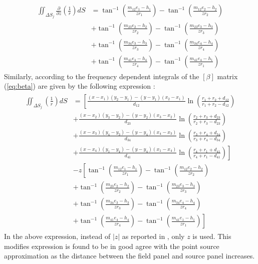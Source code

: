 \begin{align}
    \begin{split}
        \label{eq:partial_r_z}
        \iint_{\Delta S_j} \frac{\partial}{\partial z}\left(\frac{1}{r}\right) dS 
        &=\tan ^{-1}\left(\frac{m_{12} e_{1}-h_{1}}{z r_{1}}\right)-\tan ^{-1}\left(\frac{m_{12} e_{2}-h_{2}}{z r_{2}}\right) \\
        &+\tan ^{-1}\left(\frac{m_{23} e_{2}-h_{2}}{z r_{2}}\right)-\tan ^{-1}\left(\frac{m_{23} e_{3}-h_{3}}{z r_{3}}\right) \\
        &+\tan ^{-1}\left(\frac{m_{34} e_{3}-h_{3}}{z r_{3}}\right)-\tan ^{-1}\left(\frac{m_{34} e_{4}-h_{4}}{z r_{4}}\right) \\
        &+\tan ^{-1}\left(\frac{m_{41} e_{4}-h_{4}}{z r_{4}}\right)-\tan ^{-1}\left(\frac{m_{41} e_{4}-h_{1}}{z r_{1}}\right)
    \end{split}
\end{align}
\newpage
Similarly, according to \cite{katz2001low} the frequency dependent integrals of the $[\beta]$ matrix
 (\ref{eq:beta}) are given by the following expression :
\begin{align}
    \begin{split}
        \label{eq:frq_indi_beta}
       \iint_{\Delta S_j}{\left(\frac{1}{r}\right)} dS &= \left[\frac{(x-x_1)(y_2-y_1) - (y-y_1)(x_2-x_1)}{d_{12}}\ln\left(\frac{r_1+r_2+d_{12}}{r_1+r_2-d_{12}}\right)\right. \\
&+ \left.\frac{(x-x_2)(y_3-y_2)-(y-y_2)(x_3-x_2)}{d_{23}}\ln\left(\frac{r_2+r_3+d_{23}}{r_2+r_3-d_{23}}\right)\right. \\
&+ \left.\frac{(x-x_3)(y_4-y_3) -(y-y_4)(x_4-x_3)}{d_{34}}\ln\left(\frac{r_3+r_4+d_{34}}{r_3+r_4-d_{34}}\right)\right. \\
&+ \left.\frac{(x-x_4)(y_1-y_4) -(y-y_4)(x_1-x_4)}{d_{41}}\ln\left(\frac{r_4+r_1+d_{41}}{r_4+r_1-d_{41}}\right)\right] \\
&- z\left[\tan^{-1}\left(\frac{m_{12}e_1-h_1}{zr_1}\right)-\tan^{-1}\left(\frac{m_{12}e_2-h_2}{zr_2}\right)\right. \\
&+ \left.\tan^{-1}\left(\frac{m_{23}e_2-h_2}{zr_2}\right)-\tan^{-1}\left(\frac{m_{23}e_3-h_3}{zr_3}\right)\right.\\
&+ \left.\tan^{-1}\left(\frac{m_{34}e_3-h_3}{zr_3}\right)-\tan^{-1}\left(\frac{m_{34}e_4-h_4}{zr_4}\right)\right.\\
&+ \left.\tan^{-1}\left(\frac{m_{41}e_4-h_4}{zr_4}\right)-\tan^{-1}\left(\frac{m_{41}e_1-h_1}{zr_1}\right)\right] 
    \end{split}
\end{align}
In the above expression, instead of $|z|$ as reported in \cite{katz2001low}, only $z$ is used. This modifies expression is found 
to be in good agree with the point source approximation as the distance between the field panel and source panel increases.

